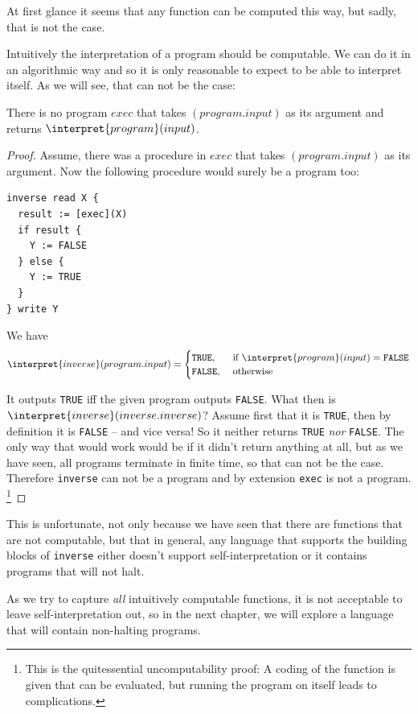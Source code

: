
At first glance it seems that any function can be computed this way, but 
sadly, that is not the case.

Intuitively the interpretation of a \FOR program should be computable. We can 
do it in an algorithmic way and so it is only reasonable to expect \FOR to be 
able to interpret itself. As we will see, that can not be the case:

\begin{theorem}
	There is no \FOR program $exec$ that takes $(program.input)$ as its 
	argument and returns $\interpret{program}(input)$.
\end{theorem}
\begin{proof}
Assume, there was a procedure in \FOR $exec$ that takes $(program.input)$ as 
its argument. Now the following procedure would surely be a \FOR program too:

\begin{verbatim}
inverse read X {
  result := [exec](X)
  if result {
    Y := FALSE
  } else {
    Y := TRUE
  }
} write Y
\end{verbatim}

We have 
\[ \interpret{inverse}(program.input) = \begin{cases}
		\mathtt{TRUE}, &\text{ if }\interpret{program}(input) = \mathtt{FALSE} \\
		\mathtt{FALSE}, &\text{ otherwise }
	\end{cases} \]

It outputs {\tt TRUE} iff the given program outputs {\tt FALSE}. What then 
is $\interpret{inverse}(inverse.inverse)$? Assume first that it is 
{\tt TRUE}, then by definition it is {\tt FALSE} -- and vice versa! So it 
neither returns {\tt TRUE} {\em nor} {\tt FALSE}. The only way that would 
work would be if it didn't return anything at all, but as we have seen, all 
\FOR programs terminate in finite time, so that can not be the case. 
Therefore {\tt inverse} can not be a \FOR program and by extension {\tt exec} 
is not a \FOR program. 
\footnote{This is the quitessential uncomputability 
	proof: A coding of the function is given that can be evaluated, but running 
  the program on itself leads to complications.}
\end{proof}

This is unfortunate, not only because we have seen that there are functions 
that are not \FOR computable, but that in general, any language that supports 
the building blocks of {\tt inverse} either doesn't support 
self-interpretation or it contains programs that will not halt.

As we try to capture {\em all} intuitively computable functions, it is not 
acceptable to leave self-interpretation out, so in the next chapter, we will 
explore a language that will contain non-halting programs.
